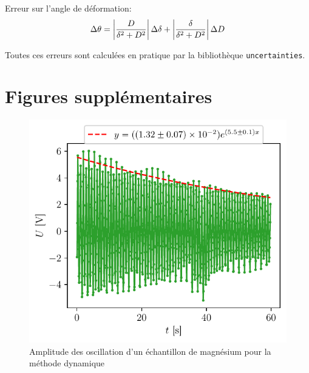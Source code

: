 Erreur sur l'angle de déformation:
\begin{equation}
    \Delta \theta = \left|\frac{D}{\delta^2 + D^2}\right| \Delta \delta + \left|\frac{\delta}{\delta^2 + D^2}\right| \Delta D
\end{equation}

Toutes ces erreurs sont calculées en pratique par la bibliothèque \texttt{uncertainties}.

\section{Figures supplémentaires}
\label{sec:figsup}

\begin{figure}[h]
    \centering
    \includegraphics[width=0.6\linewidth]{figures/magnesium1.pdf}
    \caption{Amplitude des oscillation d'un échantillon de magnésium pour la méthode dynamique}
    \label{fig:dynamique_magnesium_feur}
\end{figure}
